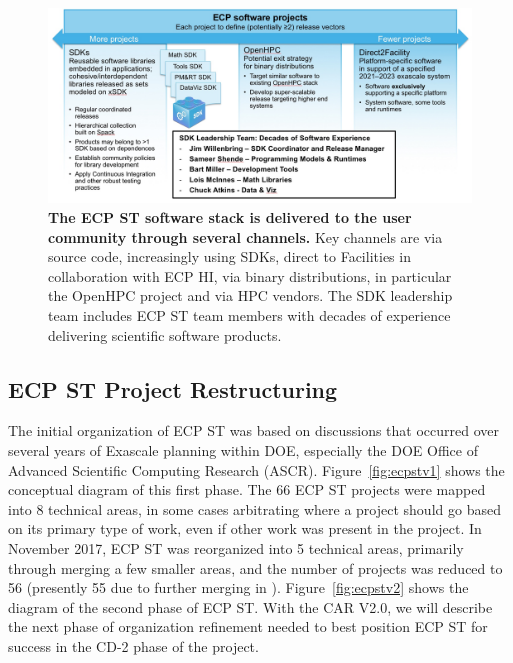 \begin{figure}
	\centering
	\includegraphics[width=0.9\linewidth]{SoftwareStack}
	\caption{\textbf{The ECP ST software stack is delivered to the user community through several channels.} Key channels are via source code, increasingly using SDKs, direct to Facilities in collaboration with ECP HI, via binary distributions, in particular the OpenHPC project and via HPC vendors.  The SDK leadership team includes  ECP ST team members with decades of experience delivering scientific software products.}
	\label{fig:softwarestack}
\end{figure}

\subsection{ECP ST Project Restructuring}\label{subsect:ProjectRestructuring}

The initial organization of ECP ST was based on discussions that occurred over several years of Exascale planning within DOE, especially the DOE Office of Advanced Scientific Computing Research (ASCR).  Figure~\ref{fig:ecpstv1} shows the conceptual diagram of this first phase.  The 66 ECP ST projects were mapped into 8 technical areas, in some cases arbitrating where a project should go based on its primary type of work, even if other work was present in the project.  In November 2017, ECP ST was reorganized into 5 technical areas, primarily through merging a few smaller areas, and the number of projects was reduced to 56 (presently 55 due to further merging in \ecosystem).  Figure~\ref{fig:ecpstv2} shows the diagram of the second phase of ECP ST.  With the CAR V2.0, we will describe the next phase of organization refinement needed to best position ECP ST for success in the CD-2 phase of the project.

